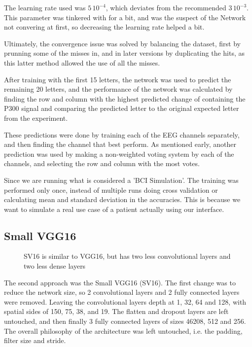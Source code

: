 \documentclass[conference]{IEEEtran}
\begin{document}
The learning rate used was $5\,10^{-4}$, which deviates from the recommended $3\, 10^{-3}$. This parameter was tinkered with for a bit, and was the suspect of the Network not convering at first, so decreasing the learning rate helped a bit.

Ultimately, the convergence issue was solved by balancing the dataset, first by prunning some of the misses in, and in later versions by duplicating the hits, as this latter method allowed the use of all the misses.

After training with the first 15 letters, the network was used to predict the remaining 20 letters, and the performance of the network was calculated by finding the row and column with the highest predicted change of containing the P300 signal and comparing the predicted letter to the original expected letter from the experiment.

These predictions were done by training each of the EEG channels separately, and then finding the channel that best perform. As mentioned early, another prediction was used by making a non-weighted voting system by each of the channels, and selecting the row and column with the most votes.

Since we are running what is considered a 'BCI Simulation'. The training was performed only once, instead of multiple runs doing cross validation or calculating mean and standard deviation in the accuracies. This is because we want to simulate a real use case of a patient actually using our interface.

\subsection{Small VGG16}
\begin{figure}[h]
\centering

\caption[SVG16 Neural Network]{SV16 is similar to VGG16, but has two less convolutional layers and two less dense layers}
\label{fig:nnv2}
\end{figure}

The second approach was the Small VGG16  (SV16). The first change was to reduce the network size, so 2 convolutional layers and 2 fully connected layers were removed. Leaving the convolutional layers depth at 1, 32, 64 and 128, with spatial sides of 150, 75, 38, and 19. The flatten and dropout layers are left untouched, and then finally 3 fully connected layers of sizes 46208, 512 and 256. The overall philosophy of the architecture was left untouched, i.e. the padding, filter size and stride.
\end{document}
